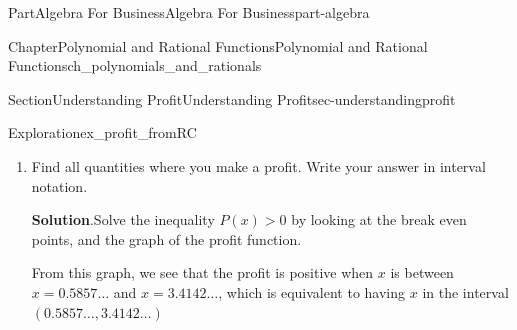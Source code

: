 \documentclass[oneside,10pt,]{tufte-book}
\newcommand{\blocktitlefont}{\relax}
\numberwithin{equation}{chapter}
\newcommand{\gt}{>}
\begin{document}
\begin{partptx}{Part}{Algebra For Business}{}{Algebra For Business}{}{}{part-algebra}
\begin{chapterptx}{Chapter}{Polynomial and Rational Functions}{}{Polynomial and Rational Functions}{}{}{ch_polynomials_and_rationals}
\begin{sectionptx}{Section}{Understanding Profit}{}{Understanding Profit}{}{}{sec-understandingprofit}
\begin{exploration}{Exploration}{}{ex_profit_fromRC}
\begin{enumerate}[font=\bfseries,label=(\alph*),ref=\alph*]
\begin{image}{0.25}{0.5}{0.25}{}
{
}%
\end{image}%
\item{}Find all quantities where you make a profit.  Write your answer in interval notation.%
\par\smallskip%
\noindent\textbf{\blocktitlefont Solution}.\hypertarget{ex_profit_fromRC-5-2}{}\quad{}Solve the inequality \(P(x)\gt 0\) by looking at the break even points, and the graph of the profit function.%
\par
From this graph, we see that the profit is positive when \(x\) is between \(x=0.5857\dots\) and \(x=3.4142\dots\), which is equivalent to having \(x\) in the interval \((0.5857\dots,3.4142\dots)\)%
\begin{image}{0.25}{0.5}{0.25}{}%
\end{image}
\end{enumerate}
\end{exploration}
\end{sectionptx}
\end{chapterptx}
\end{partptx}
\end{document}

